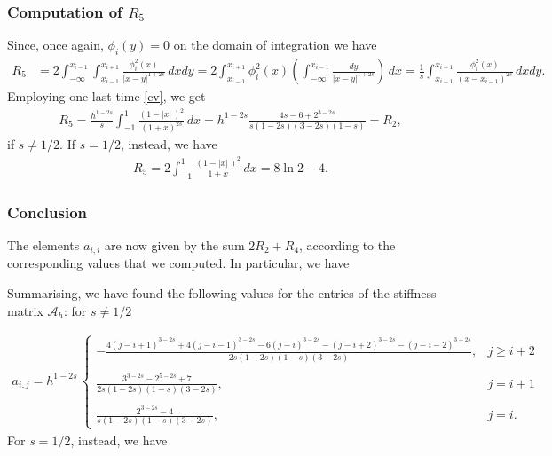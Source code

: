 \subsubsection*{Computation of $R_5$}
Since, once again, $\phi_i(y) = 0$ on the domain of integration we have
\begin{align*}
	R_5 &= 2\int_{-\infty}^{x_{i-1}}\int_{x_{i-1}}^{x_{i+1}} \frac{\phi_i^2(x)}{|x-y|^{1+2s}}\,dxdy = 2\int_{x_{i-1}}^{x_{i+1}}\phi_i^2(x)\left(\int_{-\infty}^{x_{i-1}} \frac{dy}{|x-y|^{1+2s}}\right)\,dx = \frac{1}{s}\int_{x_{i-1}}^{x_{i+1}}\frac{\phi_i^2(x)}{(x-x_{i-1})^{2s}}\,dxdy.
\end{align*}
Employing one last time \eqref{cv}, we get
\begin{align}\label{R5}
	R_5 = \frac{h^{1-2s}}{s}\int_{-1}^1 \frac{(1-|x|\,)^2}{(1+x)^{2s}}\,dx = h^{1-2s}\frac{4s-6+2^{3-2s}}{s(1-2s)(3-2s)(1-s)}=R_2,
\end{align}
if $s\neq 1/2$. If $s=1/2$, instead, we have
\begin{align*}
	R_5 = 2\int_{-1}^1 \frac{(1-|x|\,)^2}{1+x}\,dx = 8\ln 2-4.
\end{align*}

\subsubsection*{Conclusion}
The elements $a_{i,i}$ are now given by the sum $2R_2+R_4$, according to the corresponding values that we computed. In particular, we have

Summarising, we have found the following values for the entries of the stiffness matrix $\mathcal A_h$: for $s\neq 1/2$

\begin{align*}
	a_{i,j} = h^{1-2s}\,\begin{cases}
				\displaystyle - \frac{4(j-i+1)^{3-2s} + 4(j-i-1)^{3-2s}-6(j-i)^{3-2s}-(j-i+2)^{3-2s}-(j-i-2)^{3-2s}}{2s(1-2s)(1-s)(3-2s)}, & \displaystyle j\geq i+2				
				\\
				\\
				\displaystyle \frac{3^{3-2s}-2^{5-2s}+7}{2s(1-2s)(1-s)(3-2s)}, & \displaystyle j=i+1
				\\
				\\
				\displaystyle \frac{2^{3-2s}-4}{s(1-2s)(1-s)(3-2s)}, & \displaystyle j=i.
			\end{cases}	
\end{align*}
For $s=1/2$, instead, we have

